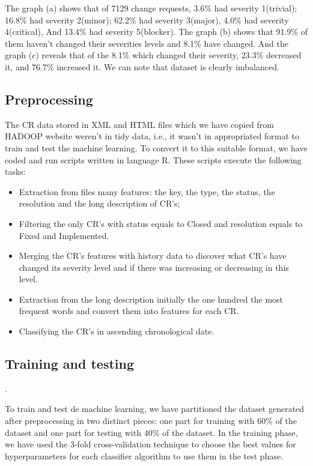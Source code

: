 \documentclass[10pt, conference]{IEEEtran}
\begin{document}
The graph (a) shows that of 7129 change requests, 3.6\% had severity 1(trivial); 16.8\% had severity 2(minor); 62.2\% had severity 3(major), 4.0\% had severity 4(critical), And 13.4\% had severity 5(blocker). The graph (b) shows that 91.9\% of them haven't changed their severities levels and 8.1\% have changed. And the graph (c) reveals that of the 8.1\% which changed their severity, 23.3\% decreased it, and 76.7\% increased it. We can note that dataset is clearly imbalanced.


\subsection{Preprocessing}
The CR data stored in XML and HTML files which we have copied from HADOOP website weren't in tidy data\cite{DeJonge2013}, i.e., it wasn't in appropriated format to train and test the machine learning. To convert it to this suitable format, we have coded and run scripts written in language R. These scripts execute the following tasks:
\begin{itemize}
 \item Extraction from files many features: the key, the type, the status, the resolution and the long description of CR's;
 \item Filtering the only CR's with status equals to Closed and resolution equals to Fixed and Implemented. 
 \item Merging the CR's features with history data to discover what CR's have changed its severity level and if there was increasing or decreasing in this level.
 \item Extraction from the long description initially the one hundred the most frequent words and convert them into features for each CR.
 \item Classifying the CR's in ascending chronological date. 
\end{itemize}


\subsection{Training and testing}. 

To train and test de machine learning, we have partitioned the dataset generated after preprocessing in two distinct pieces: one part for training with 60\% of the dataset and one part for testing with 40\% of the dataset. In the training phase, we have used the 3-fold cross-validation technique to choose the best values for hyperparameters for each classifier algorithm to use them in the test phase. 
\end{document}
